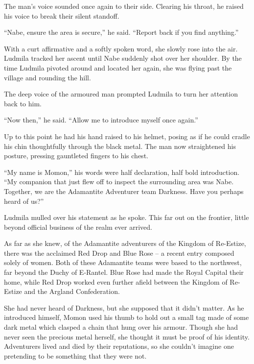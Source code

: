  

The man’s voice sounded once again to their side. Clearing his throat, he raised his voice to break their silent standoff.

 

“Nabe, ensure the area is secure,” he said. “Report back if you find anything.”

 

With a curt affirmative and a softly spoken word, she slowly rose into the air. Ludmila tracked her ascent until Nabe suddenly shot over her shoulder. By the time Ludmila pivoted around and located her again, she was flying past the village and rounding the hill.

 

The deep voice of the armoured man prompted Ludmila to turn her attention back to him.

 

“Now then,” he said. “Allow me to introduce myself once again.”

 

Up to this point he had his hand raised to his helmet, posing as if he could cradle his chin thoughtfully through the black metal. The man now straightened his posture, pressing gauntleted fingers to his chest.

 

“My name is Momon,” his words were half declaration, half bold introduction. “My companion that just flew off to inspect the surrounding area was Nabe. Together, we are the Adamantite Adventurer team Darkness. Have you perhaps heard of us?”

 

Ludmila mulled over his statement as he spoke. This far out on the frontier, little beyond official business of the realm ever arrived.

 

As far as she knew, of the Adamantite adventurers of the Kingdom of Re-Estize, there was the acclaimed Red Drop and Blue Rose – a recent entry composed solely of women. Both of these Adamantite teams were based to the northwest, far beyond the Duchy of E-Rantel. Blue Rose had made the Royal Capital their home, while Red Drop worked even further afield between the Kingdom of Re-Estize and the Argland Confederation.

 

She had never heard of Darkness, but she supposed that it didn’t matter. As he introduced himself, Momon used his thumb to hold out a small tag made of some dark metal which clasped a chain that hung over his armour. Though she had never seen the precious metal herself, she thought it must be proof of his identity. Adventurers lived and died by their reputations, so she couldn’t imagine one pretending to be something that they were not.

